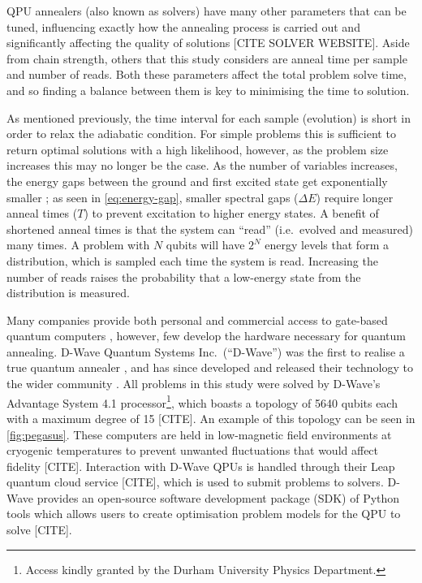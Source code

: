 \documentclass[12pt]{article}
\theoremstyle{definition}
\begin{document}
QPU annealers (also known as solvers) have many other parameters that can be tuned, influencing exactly how the annealing process is carried out and significantly affecting the quality of solutions [CITE SOLVER WEBSITE]. Aside from chain strength, others that this study considers are anneal time per sample and number of reads. Both these parameters affect the total problem solve time, and so finding a balance between them is key to minimising the time to solution.

As mentioned previously, the time interval for each sample (evolution) is short in order to relax the adiabatic condition. For simple problems this is sufficient to return optimal solutions with a high likelihood, however, as the problem size increases this may no longer be the case. As the number of variables increases, the energy gaps between the ground and first excited state get exponentially smaller \cite{bapst_quantum_2013}; as seen in \cref{eq:energy-gap}, smaller spectral gaps ($\Delta E$) require longer anneal times ($T$) to prevent excitation to higher energy states.
A benefit of shortened anneal times is that the system can ``read'' (i.e.\ evolved and measured) many times. A problem with $N$ qubits will have $2^N$ energy levels that form a distribution, which is sampled each time the system is read. Increasing the number of reads raises the probability that a low-energy state from the distribution is measured.

Many companies provide both personal and commercial access to gate-based quantum computers \cites{google}{ibm}, however, few develop the hardware necessary for quantum annealing. D-Wave Quantum Systems Inc.\ (``D-Wave'') was the first to realise a true quantum annealer \cite{johnson_quantum_2011}, and has since developed and released their technology to the wider community \cite{finley_quantum_2017}. All problems in this study were solved by D-Wave's Advantage System 4.1 processor\footnote{Access kindly granted by the Durham University Physics Department.}, which boasts a topology of \num{5640} qubits each with a maximum degree of \num{15} [CITE]. An example of this topology can be seen in \cref{fig:pegasus}. These computers are held in low-magnetic field environments at cryogenic temperatures to prevent unwanted fluctuations that would affect fidelity [CITE].
Interaction with D-Wave QPUs is handled through their Leap quantum cloud service [CITE], which is used to submit problems to solvers. D-Wave provides an open-source software development package (SDK) of Python tools which allows users to create optimisation problem models for the QPU to solve [CITE].
\end{document}
